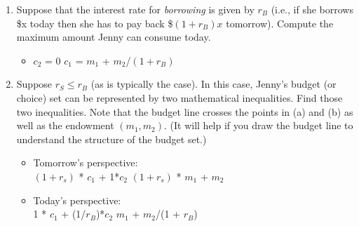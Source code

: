 \documentclass[11pt]{article}
\begin{document}
\begin{enumerate}
\begin{enumerate}
        \item Suppose that the interest rate for \emph{borrowing} is given by $r_{B}$ (i.e., if she borrows \$x today then she has to pay back \$$(1+r_{B})x$ tomorrow). Compute the maximum amount Jenny can consume today.
        \begin{itemize}
            \item $c_{2}$ = 0 \hspace{1cm} \Rightarrow \hspace{1cm} $c_{1}$ = $m_{1}$ + $m_{2}$/$(1 + r_{B})$
        \end{itemize}

        \item Suppose $r_{S}\leq r_{B}$ (as is typically the case). In this case, Jenny's budget (or choice) set can be represented by two mathematical inequalities. Find those two inequalities. Note that the budget line crosses the points in (a) and (b) as well as the endowment $(m_{1},m_{2})$. (It will help if you draw the budget line to understand the structure of the budget set.)
        \begin{itemize}
            \item Tomorrow’s perspective:\\
            $(1 + r_{s})$ * $c_{1}$ + 1*$c_{2}$ \hspace{1cm} \geq \hspace{1cm} $(1 + r_{s})$ * $m_{1}$ + $m_{2}$
            \item Today’s perspective: \\
            1 * $c_{1}$ + (1/$r_{B}$)*$c_{2}$ \hspace{1.1cm} \geq \hspace{1cm} $m_{1}$ + $m_{2}$/(1 + $r_{B}$)
        \end{itemize}
    \end{enumerate}


\end{enumerate}
\end{document}
